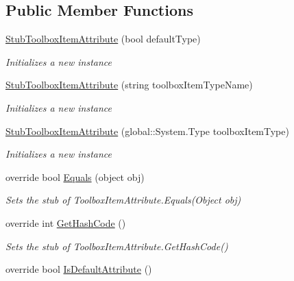 \subsection*{Public Member Functions}
\begin{DoxyCompactItemize}
\item 
\hyperlink{class_system_1_1_component_model_1_1_fakes_1_1_stub_toolbox_item_attribute_a12906a473aee26e2f59e9f0b15fbfcdd}{Stub\-Toolbox\-Item\-Attribute} (bool default\-Type)
\begin{DoxyCompactList}\small\item\em Initializes a new instance\end{DoxyCompactList}\item 
\hyperlink{class_system_1_1_component_model_1_1_fakes_1_1_stub_toolbox_item_attribute_af3eb9473d1fa80b7a3376fa96fda9bdf}{Stub\-Toolbox\-Item\-Attribute} (string toolbox\-Item\-Type\-Name)
\begin{DoxyCompactList}\small\item\em Initializes a new instance\end{DoxyCompactList}\item 
\hyperlink{class_system_1_1_component_model_1_1_fakes_1_1_stub_toolbox_item_attribute_a74a02b0eafd13fa95712189993843bb3}{Stub\-Toolbox\-Item\-Attribute} (global\-::\-System.\-Type toolbox\-Item\-Type)
\begin{DoxyCompactList}\small\item\em Initializes a new instance\end{DoxyCompactList}\item 
override bool \hyperlink{class_system_1_1_component_model_1_1_fakes_1_1_stub_toolbox_item_attribute_a1ee5ee0a20abfd412a35aca8b832bd06}{Equals} (object obj)
\begin{DoxyCompactList}\small\item\em Sets the stub of Toolbox\-Item\-Attribute.\-Equals(\-Object obj)\end{DoxyCompactList}\item 
override int \hyperlink{class_system_1_1_component_model_1_1_fakes_1_1_stub_toolbox_item_attribute_ad2bec148b536a8f5392b880b4abb6a90}{Get\-Hash\-Code} ()
\begin{DoxyCompactList}\small\item\em Sets the stub of Toolbox\-Item\-Attribute.\-Get\-Hash\-Code()\end{DoxyCompactList}\item 
override bool \hyperlink{class_system_1_1_component_model_1_1_fakes_1_1_stub_toolbox_item_attribute_a04c30c2861f0c7930417d2fb3595cba6}{Is\-Default\-Attribute} ()

\end{DoxyCompactItemize}
